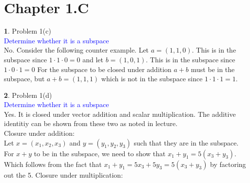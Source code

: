\documentclass[10pt, twocolumn]{article}
\newcommand{\question}[1]{\textcolor{blue}{#1} \\}
\theoremstyle{definition}
\newtheorem{q}{}
\begin{document}
\section{Chapter 1.C}
\begin{q}
    Problem 1(c) \\
    \question{Determine whether it is a subspace}
    No. Consider the following counter example. 
    Let $ a = (1, 1, 0) $. This is in the subspace since $ 1 \cdot 1 \cdot 0 = 0 $ 
    and let  $ b = (1, 0, 1) $. This is in the subspace since $ 1 \cdot 0 \cdot 1 = 0 $ 
    For the subspace to be closed under addition $ a + b $ must be in the subspace, 
    but $ a + b = (1, 1, 1) $ which is not in the subspace since $ 1 \cdot 1 \cdot 1 = 1 $.
\end{q}
\begin{q}
    Problem 1(d) \\
    \question{Determine whether it is a subspace}
    Yes. It is closed under vector addition and scalar multiplication. The additive identitiy can be shown from these two as noted in lecture.\\
    Closure under addition: \\
    Let $ x = (x_1, x_2, x_3) $ and $ y = (y_1, y_2, y_3) $ such that they are in the subspace.
    For $ x + y $ to be in the subspace, we need to show that $ x_1 + y_1 = 5(x_3 + y_3) $. 
    Which follows from the fact that $ x_1 + y_1 = 5x_3 + 5y_3 = 5(x_3 + y_3) $  by factoring out the 5. 
    Closure under multiplication: \\
    
\end{q}
\end{document}
